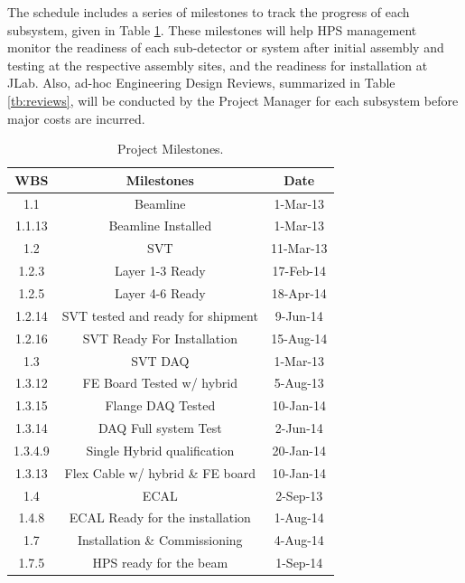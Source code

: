The schedule includes a series of milestones to track the progress of each subsystem, given in Table \ref{tb:milestones}. These milestones will help HPS management monitor the readiness of each 
sub-detector or system after initial assembly and testing at the respective assembly sites, and the readiness for installation at JLab.  
Also, ad-hoc Engineering Design Reviews, summarized in Table \ref{tb:reviews}, will be conducted by the Project Manager for each subsystem before major costs are incurred.

 
\begin{table}[htdp]
\caption{Project Milestones.}
\begin{center}
\begin{tabular}{|c|c|c|}
\hline
WBS & Milestones & Date\\
\hline\hline

1.1	&Beamline	&1-Mar-13\\
\hline
1.1.13	&Beamline Installed	&1-Mar-13\\
\hline
1.2	&SVT	&11-Mar-13\\
\hline
1.2.3	&Layer 1-3 Ready	&17-Feb-14\\
\hline
1.2.5	&Layer 4-6 Ready	&18-Apr-14\\
\hline
1.2.14	&SVT tested and ready for shipment	&9-Jun-14\\
\hline
1.2.16	&SVT Ready For Installation	&15-Aug-14\\
\hline
1.3	&SVT DAQ	&1-Mar-13\\
\hline
1.3.12	&FE Board Tested w/ hybrid	&5-Aug-13\\
\hline
1.3.15	&Flange DAQ Tested	&10-Jan-14\\
\hline
1.3.14	&DAQ Full system Test	&2-Jun-14\\
\hline
1.3.4.9	&Single Hybrid qualification	&20-Jan-14\\
\hline
1.3.13	&Flex Cable w/ hybrid \& FE board	&10-Jan-14\\
\hline
1.4	&ECAL	&2-Sep-13\\
\hline
1.4.8	&ECAL Ready for the installation	&1-Aug-14\\
\hline
1.7	&Installation \& Commissioning	&4-Aug-14\\
\hline
1.7.5	&HPS ready for the beam	&1-Sep-14\\
\hline
\hline
\end{tabular}
\end{center}
\label{tb:milestones}
\end{table}%


